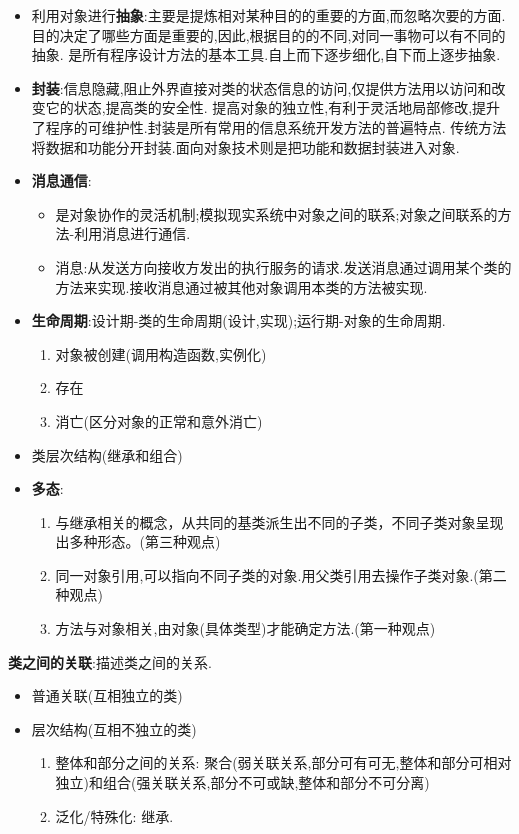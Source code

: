 \documentclass[../main.tex]{subfiles}
\begin{document}
\begin{itemize}
  \item 利用对象进行\textbf{抽象}:主要是提炼相对某种目的的重要的方面,而忽略次要的方面.目的决定了哪些方面是重要的,因此,根据目的的不同,对同一事物可以有不同的抽象.
    是所有程序设计方法的基本工具.自上而下逐步细化,自下而上逐步抽象.
  \item \textbf{封装}:信息隐藏,阻止外界直接对类的状态信息的访问,仅提供方法用以访问和改变它的状态,提高类的安全性.
    提高对象的独立性,有利于灵活地局部修改,提升了程序的可维护性.封装是所有常用的信息系统开发方法的普遍特点.
    传统方法将数据和功能分开封装.面向对象技术则是把功能和数据封装进入对象.
  \item \textbf{消息通信}:
    \begin{itemize}
      \item 是对象协作的灵活机制;模拟现实系统中对象之间的联系;对象之间联系的方法-利用消息进行通信.
      \item 消息:从发送方向接收方发出的执行服务的请求.发送消息通过调用某个类的方法来实现.接收消息通过被其他对象调用本类的方法被实现.
    \end{itemize}
  \item \textbf{生命周期}:设计期-类的生命周期(设计,实现);运行期-对象的生命周期.
    \begin{enumerate}
      \item 对象被创建(调用构造函数,实例化)
      \item 存在
      \item 消亡(区分对象的正常和意外消亡)
    \end{enumerate}
  \item 类层次结构(继承和组合)
  \item \textbf{多态}:
    \begin{enumerate}
      \item 与继承相关的概念，从共同的基类派生出不同的子类，不同子类对象呈现出多种形态。(第三种观点)
      \item 同一对象引用,可以指向不同子类的对象.用父类引用去操作子类对象.(第二种观点)
      \item 方法与对象相关,由对象(具体类型)才能确定方法.(第一种观点)
    \end{enumerate}
\end{itemize}
\textbf{类之间的关联}:描述类之间的关系.
\begin{itemize}
  \item 普通关联(互相独立的类)
  \item 层次结构(互相不独立的类)
    \begin{enumerate}
      \item 整体和部分之间的关系:
        聚合(弱关联关系,部分可有可无,整体和部分可相对独立)和组合(强关联关系,部分不可或缺,整体和部分不可分离)
      \item 泛化/特殊化: 继承.
    \end{enumerate}
\end{itemize}
\end{document}
